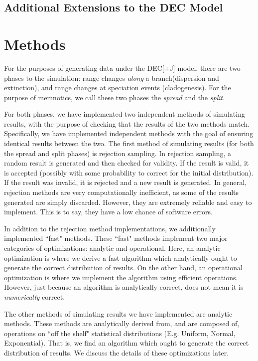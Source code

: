 \documentclass{article}
\begin{document}
\subsection{Additional Extensions to the DEC Model}

\section{Methods}

For the purposes of generating data under the DEC[+J] model, there are two
phases to the simulation: range changes \textit{along} a branch(dispersion and
extinction), and range changes at speciation events (cladogenesis).
For the purpose of memnotics, we call these two phases the \textit{spread} and
the \textit{split}.

For both phases, we have implemented two independent methods of simulating
results, with the purpose of checking that the results of the two methods match.
Specifically, we have implemented independent methods with the goal of ensuring
identical results between the two.
The first method of simulating results (for both the spread and split phases) is
rejection sampling.
In rejection sampling, a random result is generated and then checked for
validity.
If the result is valid, it is accepted (possibly with some probability to
correct for the initial distribution).
If the result was invalid, it is rejected and a new result is generated.
In general, rejection methods are very computationally inefficient, as some of
the results generated are simply discarded. 
However, they are extremely reliable and easy to implement.
This is to say, they have a low chance of software errors.

In addition to the rejection method implementations, we additionally implemented 
``fast" methods.
These ``fast" methods implement two major categories of optimizations: analytic
and operational.
Here, an analytic optimization is where we derive a fast algorithm which
analytically ought to generate the correct distribution of results.
On the other hand, an operational optimization is where we implement the
algorithm using efficient operations.
However, just because an algorithm is analytically correct, does not mean it is
\textit{numerically} correct\cite{goldberg_what_1991, noauthor_ieee_1985}.

The other methods of simulating results we have implemented are analytic
methods.
These methods are analytically derived from, and are composed of, operations on
``off the shelf" statistical distributions (E.g. Uniform, Normal, Exponential).
That is, we find an algorithm which ought to generate the correct distribution
of results.
We discuss the details of these optimizations later.
\end{document}
